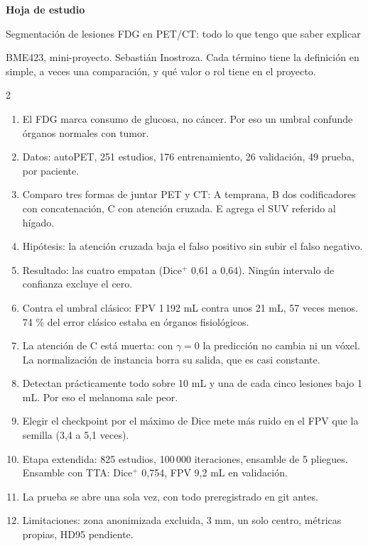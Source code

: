 \documentclass[9pt,a4paper]{extarticle}
\begin{document}
{\sffamily\bfseries\LARGE\color{tinta} Hoja de estudio\par}
{\sffamily\large Segmentación de lesiones FDG en PET/CT: todo lo que tengo que saber explicar\par}
\vspace{0.3em}
{\small BME423, mini-proyecto. Sebastián Inostroza. Cada término tiene la definición en simple, a veces una comparación, y qué valor o rol tiene en el proyecto.\par}

\begin{tcolorbox}[colback=fondo,colframe=tinta,boxrule=0.5pt,arc=1pt,left=6pt,right=6pt,top=4pt,bottom=4pt,title={\sffamily\bfseries Lo que tengo que poder decir sin mirar}]
\small
\begin{multicols}{2}
\begin{enumerate}[nosep,leftmargin=1.3em]
\item El FDG marca consumo de glucosa, no cáncer. Por eso un umbral confunde órganos normales con tumor.
\item Datos: autoPET, 251 estudios, 176 entrenamiento, 26 validación, 49 prueba, por paciente.
\item Comparo tres formas de juntar PET y CT: A temprana, B dos codificadores con concatenación, C con atención cruzada. E agrega el SUV referido al hígado.
\item Hipótesis: la atención cruzada baja el falso positivo sin subir el falso negativo.
\item Resultado: las cuatro empatan (Dice$^{+}$ 0,61 a 0,64). Ningún intervalo de confianza excluye el cero.
\item Contra el umbral clásico: FPV 1\,192 mL contra unos 21 mL, 57 veces menos. 74 \% del error clásico estaba en órganos fisiológicos.
\item La atención de C está muerta: con $\gamma = 0$ la predicción no cambia ni un vóxel. La normalización de instancia borra su salida, que es casi constante.
\item Detectan prácticamente todo sobre 10 mL y una de cada cinco lesiones bajo 1 mL. Por eso el melanoma sale peor.
\item Elegir el checkpoint por el máximo de Dice mete más ruido en el FPV que la semilla (3,4 a 5,1 veces).
\item Etapa extendida: 825 estudios, 100\,000 iteraciones, ensamble de 5 pliegues. Ensamble con TTA: Dice$^{+}$ 0,754, FPV 9,2 mL en validación.
\item La prueba se abre una sola vez, con todo preregistrado en git antes.
\item Limitaciones: zona anonimizada excluida, 3 mm, un solo centro, métricas propias, HD95 pendiente.
\end{enumerate}
\end{multicols}
\end{tcolorbox}
\end{document}
